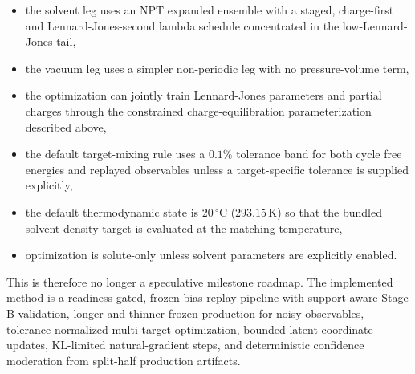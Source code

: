 \begin{itemize}
    \item the solvent leg uses an NPT expanded ensemble with a staged, charge-first and Lennard-Jones-second lambda schedule concentrated in the low-Lennard-Jones tail,
    \item the vacuum leg uses a simpler non-periodic leg with no pressure-volume term,
    \item the optimization can jointly train Lennard-Jones parameters and partial charges through the constrained charge-equilibration parameterization described above,
    \item the default target-mixing rule uses a $0.1\%$ tolerance band for both cycle free energies and replayed observables unless a target-specific tolerance is supplied explicitly,
    \item the default thermodynamic state is $20\,^\circ\mathrm{C}$ ($293.15\,\mathrm{K}$) so that the bundled solvent-density target is evaluated at the matching temperature,
    \item optimization is solute-only unless solvent parameters are explicitly enabled.
\end{itemize}

This is therefore no longer a speculative milestone roadmap. The implemented method is a readiness-gated, frozen-bias replay pipeline with support-aware Stage B validation, longer and thinner frozen production for noisy observables, tolerance-normalized multi-target optimization, bounded latent-coordinate updates, KL-limited natural-gradient steps, and deterministic confidence moderation from split-half production artifacts.
